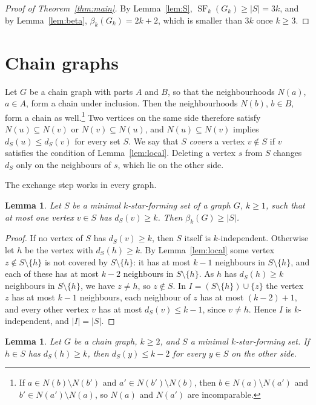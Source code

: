 \documentclass[11pt]{amsart}
\newtheorem{lemma}[theorem]{Lemma}
\theoremstyle{definition}
\theoremstyle{remark}
\newcommand{\SF}{\operatorname{SF}}
\begin{document}
\begin{proof}[Proof of Theorem~\ref{thm:main}]
By Lemma~\ref{lem:S}, $\SF_k(G_k)\ge|S|=3k$, and by Lemma~\ref{lem:beta}, $\beta_k(G_k)=2k+2$, which is smaller than $3k$ once $k\ge3$.
\end{proof}

\section{Chain graphs}\label{sec:chain}

Let $G$ be a chain graph with parts $A$ and $B$, so that the neighbourhoods $N(a)$, $a\in A$, form a chain under inclusion. Then the neighbourhoods $N(b)$, $b\in B$, form a chain as well.\footnote{If $a\in N(b)\setminus N(b')$ and $a'\in N(b')\setminus N(b)$, then $b\in N(a)\setminus N(a')$ and $b'\in N(a')\setminus N(a)$, so $N(a)$ and $N(a')$ are incomparable.} Two vertices on the same side therefore satisfy $N(u)\subseteq N(v)$ or $N(v)\subseteq N(u)$, and $N(u)\subseteq N(v)$ implies $d_S(u)\le d_S(v)$ for every set $S$. We say that $S$ \emph{covers} a vertex $v\notin S$ if $v$ satisfies the condition of Lemma~\ref{lem:local}. Deleting a vertex $s$ from $S$ changes $d_S$ only on the neighbours of $s$, which lie on the other side.

The exchange step works in every graph.

\begin{lemma}\label{lem:exchange}
Let $S$ be a minimal $k$-star-forming set of a graph $G$, $k\ge1$, such that at most one vertex $v\in S$ has $d_S(v)\ge k$. Then $\beta_k(G)\ge|S|$.
\end{lemma}

\begin{proof}
If no vertex of $S$ has $d_S(v)\ge k$, then $S$ itself is $k$-independent. Otherwise let $h$ be the vertex with $d_S(h)\ge k$. By Lemma~\ref{lem:local} some vertex $z\notin S\setminus\{h\}$ is not covered by $S\setminus\{h\}$: it has at most $k-1$ neighbours in $S\setminus\{h\}$, and each of these has at most $k-2$ neighbours in $S\setminus\{h\}$. As $h$ has $d_S(h)\ge k$ neighbours in $S\setminus\{h\}$, we have $z\ne h$, so $z\notin S$. In $I=(S\setminus\{h\})\cup\{z\}$ the vertex $z$ has at most $k-1$ neighbours, each neighbour of $z$ has at most $(k-2)+1$, and every other vertex $v$ has at most $d_S(v)\le k-1$, since $v\ne h$. Hence $I$ is $k$-independent, and $|I|=|S|$.
\end{proof}

\begin{lemma}\label{lem:otherside}
Let $G$ be a chain graph, $k\ge2$, and $S$ a minimal $k$-star-forming set. If $h\in S$ has $d_S(h)\ge k$, then $d_S(y)\le k-2$ for every $y\in S$ on the other side.
\end{lemma}
\end{document}
